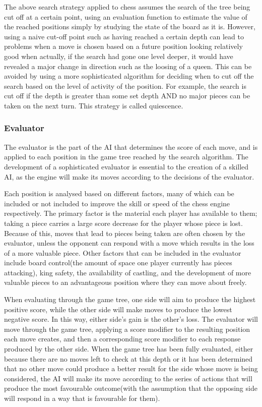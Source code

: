 \documentclass{l3proj}
\begin{document}
	The above search strategy applied to chess assumes the search of the tree being cut off at
a certain point, using an evaluation function to estimate the value of the reached positions
simply by studying the state of the board as it is. However, using a naive cut-off point such
as having reached a certain depth can lead to problems when a move is chosen based on
a future position looking relatively good when actually, if the search had gone one level
deeper, it would have revealed a major change in direction such as the loosing of a queen.
This can be avoided by using a more sophisticated algorithm for deciding when to cut off
the search based on the level of activity of the position. For example, the search is cut off
if the depth is greater than some set depth AND no major pieces can be taken on the next
turn. This strategy is called quiescence.


\subsubsection{Evaluator}

	The evaluator is the part of the AI that determines the score of each move, and is applied to each position in the game tree reached by the search algorithm. The development of a sophisticated evaluator is essential to the creation of a skilled AI, as the engine will make its moves according to the decisions of the evaluator.

	Each position is analysed based on different factors, many of which can be included or not included to improve the skill or speed of the chess engine respectively. The primary factor is the material each player has available to them; taking a piece carries a large score decrease for the player whose piece is lost. Because of this, moves that lead to pieces being taken are often chosen by the evaluator, unless the opponent can respond with a move which results in the loss of a more valuable piece.  Other factors that can be included in the evaluator include board control(the amount of space one player currently has pieces attacking), king safety, the availability of castling, and the development of more valuable pieces to an advantageous position where they can move about freely.

	When evaluating through the game tree, one side will aim to produce the highest positive score, while the other side will make moves to produce the lowest negative score. In this way, either side's gain is the other's loss. The evaluator will move through the game tree, applying a score modifier to the resulting position each move creates, and then a corresponding score modifier to each response produced by the other side. When the game tree has been fully evaluated, either because there are no moves left to check at this depth or it has been determined that no other move could produce a better result for the side whose move is being considered, the AI will make its move according to the series of actions that will produce the most favourable outcome(with the assumption that the opposing side will respond in a way that is favourable for them).
\end{document}

